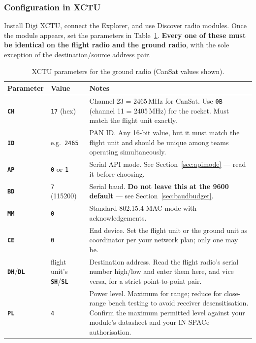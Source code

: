 \documentclass[11pt,a4paper]{article}
\newcommand{\code}[1]{\texttt{#1}}
\newcommand{\param}[1]{\textbf{\texttt{#1}}}
\begin{document}
\subsubsection{Configuration in XCTU}

Install Digi XCTU, connect the Explorer, and use \textsf{Discover radio
modules}. Once the module appears, set the parameters in
Table~\ref{tab:xctu}. \textbf{Every one of these must be identical on the
flight radio and the ground radio}, with the sole exception of the
destination/source address pair.

\begin{table}[htbp]
\centering
\caption{XCTU parameters for the ground radio (CanSat values shown).}
\label{tab:xctu}
\small
\begin{tabularx}{\textwidth}{@{}llX@{}}
\toprule
\textbf{Parameter} & \textbf{Value} & \textbf{Notes}\\
\midrule
\param{CH} & \code{17} (hex) & Channel 23 = 2465\,MHz for CanSat. Use \code{0B} (channel 11 = 2405\,MHz) for the rocket. Must match the flight unit exactly.\\
\param{ID} & e.g.\ \code{2465} & PAN ID. Any 16-bit value, but it must match the flight unit and should be unique among teams operating simultaneously.\\
\param{AP} & \code{0} or \code{1} & Serial API mode. See Section~\ref{sec:apimode} --- read it before choosing.\\
\param{BD} & \code{7} (115200) & Serial baud. \textbf{Do not leave this at the 9600 default} --- see Section~\ref{sec:baudbudget}.\\
\param{MM} & \code{0} & Standard 802.15.4 MAC mode with acknowledgements.\\
\param{CE} & \code{0} & End device. Set the flight unit or the ground unit as coordinator per your network plan; only one may be.\\
\param{DH}/\param{DL} & flight unit's \param{SH}/\param{SL} & Destination address. Read the flight radio's serial number high/low and enter them here, and vice versa, for a strict point-to-point pair.\\
\param{PL} & \code{4} & Power level. Maximum for range; reduce for close-range bench testing to avoid receiver desensitisation. Confirm the maximum permitted level against your module's datasheet and your IN-SPACe authorisation.\\
\bottomrule
\end{tabularx}
\end{table}
\end{document}
